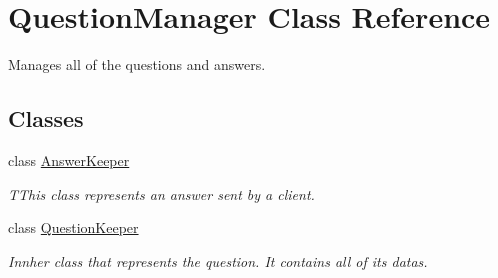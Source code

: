 \hypertarget{class_question_manager}{\section{Question\-Manager Class Reference}
\label{class_question_manager}
}


Manages all of the questions and answers.  


\subsection*{Classes}
\begin{DoxyCompactItemize}
\item 
class \hyperlink{class_question_manager_1_1_answer_keeper}{Answer\-Keeper}
\begin{DoxyCompactList}\small\item\em T\-This class represents an answer sent by a client.\end{DoxyCompactList}\item 
class \hyperlink{class_question_manager_1_1_question_keeper}{Question\-Keeper}
\begin{DoxyCompactList}\small\item\em Innher class that represents the question. It contains all of its datas. \end{DoxyCompactList}\end{DoxyCompactItemize}
